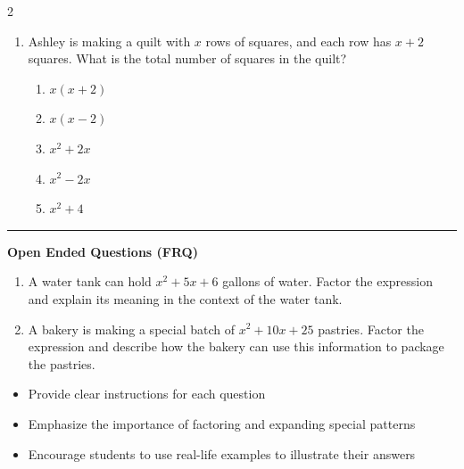 \documentclass[10pt]{article}
\begin{document}
\begin{multicols}{2}
\begin{enumerate}[label=\textbf{Q\arabic*.}, leftmargin=*, itemsep=6pt, parsep=0pt]
  \item \small Ashley is making a quilt with $x$ rows of squares, and each row has $x + 2$ squares. What is the total number of squares in the quilt?
  \begin{enumerate}[label=(\Alph*), leftmargin=0.6cm, nosep, itemsep=2pt]
    \item $x(x + 2)$
    \item $x(x - 2)$
    \item $x^2 + 2x$
    \item $x^2 - 2x$
    \item $x^2 + 4$
  \end{enumerate}

\end{enumerate}
\end{multicols}

\vspace{-0.2cm}
\hrule
\vspace{0.2cm}
\textbf{\small Open Ended Questions (FRQ)}
\begin{enumerate}[label=\textbf{Q\arabic*.}, start=9, itemsep=5pt, topsep=0pt]

  \item \small A water tank can hold $x^2 + 5x + 6$ gallons of water. Factor the expression and explain its meaning in the context of the water tank. \vspace{2cm}

  \item \small A bakery is making a special batch of $x^2 + 10x + 25$ pastries. Factor the expression and describe how the bakery can use this information to package the pastries. \vspace{2cm}

\end{enumerate}

\vfill

\begin{tcolorbox}[colback=blue!5, colframe=mainblue!50, title=\small \textbf{Chef's Tips}, fonttitle=\bfseries, bottom=1mm]
\begin{itemize}[noitemsep, topsep=2pt, leftmargin=0.5cm]
  \item \scriptsize Provide clear instructions for each question\item \scriptsize Emphasize the importance of factoring and expanding special patterns\item \scriptsize Encourage students to use real-life examples to illustrate their answers
\end{itemize}
\end{tcolorbox}
\end{document}
